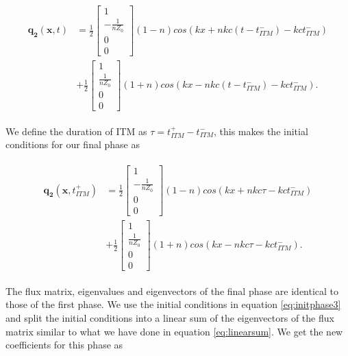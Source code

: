 \begin{align}
    \begin{split}
        \mathbf{q_2}\left(\mathbf{x}, t\right) &= 
        \frac{1}{2} \begin{bmatrix}
            1 \\
            -\frac{1}{nZ_0} \\
            0 \\
            0
        \end{bmatrix} \left(1 - n\right) cos\left(kx +nk c \left(t - t_{ITM}^-\right) - k c t_{ITM}^-\right) \\ 
        &+ \frac{1}{2} 
        \begin{bmatrix}
            1 \\
            \frac{1}{nZ_0} \\
            0 \\
            0
        \end{bmatrix} \left(1 + n\right) cos\left(kx - nk c \left(t - t_{ITM}^-\right) - k c t_{ITM}^-\right) .
    \end{split}
\end{align}

We define the duration of \ac{ITM} as $\tau = t_{ITM}^+ - t_{ITM}^-$, this makes the initial conditions for our final phase as

\begin{align}
    \begin{split}
        \mathbf{q_2}\left(\mathbf{x}, t_{ITM}^+\right) &= 
        \frac{1}{2} \begin{bmatrix}
            1 \\
            -\frac{1}{nZ_0} \\
            0 \\
            0
        \end{bmatrix} \left(1 - n\right) cos\left(kx +nk c \tau - k c t_{ITM}^-\right) \\ 
        &+ \frac{1}{2} 
        \begin{bmatrix}
            1 \\
            \frac{1}{nZ_0} \\
            0 \\
            0
        \end{bmatrix} \left(1 + n\right) cos\left(kx - nk c \tau - k c t_{ITM}^-\right) .
    \end{split}
    \label{eq:initphase3}
\end{align}

The flux matrix, eigenvalues and eigenvectors of the final phase are identical to those of the first phase. We use the initial conditions in equation \ref{eq:initphase3}
and split the initial conditions into a linear sum of the eigenvectors of the flux matrix similar to what we have done in equation \ref{eq:linearsum}. 
We get the new coefficients for this phase as

